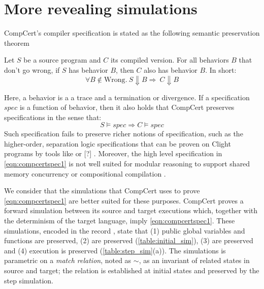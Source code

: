 \section{More revealing simulations}\label{sec:compcert-sim}

CompCert's compiler specification is stated as the following semantic preservation theorem

\begin{theorem}
Let $S$ be a source program and $C$ its compiled version. For all behaviors $B$ that don't go wrong, if $S$ has behavior $B$, then  
$C$ also has behavior $B$. In short:
\begin{equation}\forall B \not \in \text{Wrong}. \ S \Downarrow B \Rightarrow \ C \Downarrow B\label{eqn:compcertspec1}\end{equation}
\end{theorem}
Here, a behavior is a a trace and a termination or divergence. If a specification $spec$ is a function of behavior, then it also holds that CompCert preserves specifications in the sense that:
\begin{equation} S \models spec \Rightarrow C \models spec \end{equation}
Such specification fails to preserve richer notions of specification, such as the higher-order, separation logic specifications that can be proven on Clight programs by tools like \cite{DBLP:journals/jar/CaoBGDA18} or [?]%
. Moreover, the high level specification in \ref{eqn:compcertspec1} is not well suited for modular reasoning to support shared memory concurrency or compositional compilation \cite{compcomp}. 

We consider that the simulations that CompCert uses to prove \ref{eqn:compcertspec1} are better suited for these purposes.
CompCert proves a forward simulation between its source and target executions which, together with the determinism of the target language, imply \ref{eqn:compcertspec1}. These simulations, encoded in the record , state that (1) public global variables and functions are preserved, (2)  are preserved (\ref{table:initial_sim}), (3)  are preserved and (4) execution is preserved (\ref{table:step_sim}(a)). The simulations is parametric on a \emph{match relation}, noted as $\overset{ }{\sim}$, as an invariant of related states in source and target; the relation is established at initial states and preserved by the step simulation. 

